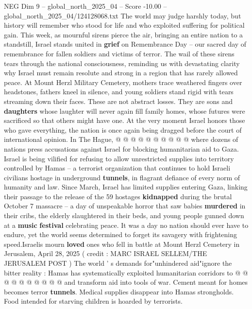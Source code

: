 \begin{textsample}{NEG Dim 9 – global\_north\_2025\_04 – Score -10.00 – global\_north\_2025\_04/124128068.txt}  \label{ex:f9_neg_121}
The world may judge harshly today, but history will remember who stood for life and who exploited suffering for political gain.
This week, as mournful sirens pierce the air, bringing an entire nation to a standstill, Israel stands united in \textbf{grief} on Remembrance Day -- our sacred day of remembrance for fallen soldiers and victims of terror.
The wail of these sirens tears through the national consciousness, reminding us with devastating clarity why Israel must remain resolute and strong in a region that has rarely allowed peace.
At Mount Herzl Military Cemetery, mothers trace weathered fingers over headstones, fathers kneel in silence, and young soldiers stand rigid with tears streaming down their faces.
These are not abstract losses.
They are sons and \textbf{daughters} whose laughter will never again fill family homes, whose futures were sacrificed so that others might have one.
At the very moment Israel honors those who gave everything, the nation is once again being dragged before the court of international opinion.
In The Hague, @ @ @ @ @ @ @ @ @ @ where dozens of nations press accusations against Israel for blocking humanitarian aid to Gaza.
Israel is being vilified for refusing to allow unrestricted supplies into territory controlled by Hamas -- a terrorist organization that continues to hold Israeli civilians hostage in underground \textbf{tunnels}, in flagrant defiance of every norm of humanity and law.
Since March, Israel has limited supplies entering Gaza, linking their passage to the release of the 59 hostages \textbf{kidnapped} during the brutal October 7 massacre -- a day of unspeakable horror that saw babies \textbf{murdered} in their cribs, the elderly slaughtered in their beds, and young people gunned down at a \textbf{music} \textbf{festival} celebrating peace.
It was a day no nation should ever have to endure, yet the world seems determined to forget its savagery with frightening speed.Israelis mourn \textbf{loved} ones who fell in battle at Mount Herzl Cemetery in Jerusalem, April 28, 2025 ( credit : MARC ISRAEL SELLEM/THE JERUSALEM POST ) The world ' s demands for"unhindered aid"ignore the bitter reality : Hamas has systematically exploited humanitarian corridors to @ @ @ @ @ @ @ @ @ @ and transform aid into tools of war.
Cement meant for homes becomes terror \textbf{tunnels}.
Medical supplies disappear into Hamas strongholds.
Food intended for starving children is hoarded by terrorists.

\end{textsample}
